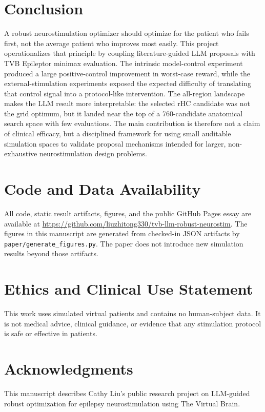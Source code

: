 \documentclass{article}
\begin{document}
\section{Conclusion}
A robust neurostimulation optimizer should optimize for the patient who fails first, not the average patient who improves most easily. This project operationalizes that principle by coupling literature-guided LLM proposals with TVB Epileptor minimax evaluation. The intrinsic model-control experiment produced a large positive-control improvement in worst-case reward, while the external-stimulation experiments exposed the expected difficulty of translating that control signal into a protocol-like intervention. The all-region landscape makes the LLM result more interpretable: the selected rHC candidate was not the grid optimum, but it landed near the top of a 760-candidate anatomical search space with few evaluations. The main contribution is therefore not a claim of clinical efficacy, but a disciplined framework for using small auditable simulation spaces to validate proposal mechanisms intended for larger, non-exhaustive neurostimulation design problems.

\section*{Code and Data Availability}
All code, static result artifacts, figures, and the public GitHub Pages essay are available at \url{https://github.com/liuzhitong330/tvb-llm-robust-neurostim}. The figures in this manuscript are generated from checked-in JSON artifacts by \texttt{paper/generate\_figures.py}. The paper does not introduce new simulation results beyond those artifacts.

\section*{Ethics and Clinical Use Statement}
This work uses simulated virtual patients and contains no human-subject data. It is not medical advice, clinical guidance, or evidence that any stimulation protocol is safe or effective in patients.

\section*{Acknowledgments}
This manuscript describes Cathy Liu's public research project on LLM-guided robust optimization for epilepsy neurostimulation using The Virtual Brain.
\end{document}
